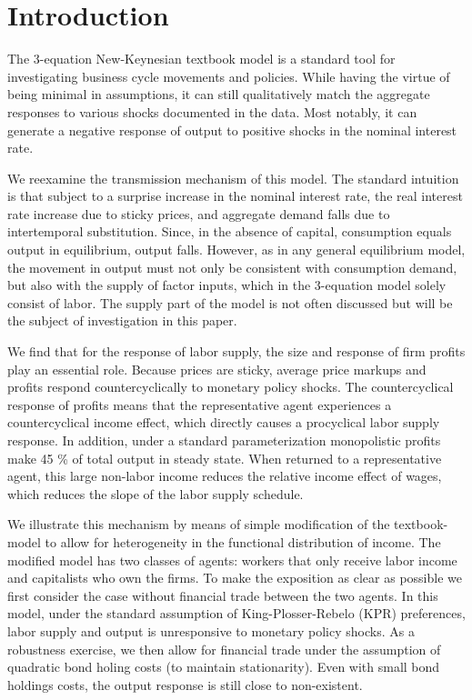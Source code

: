 \section{Introduction}
The 3-equation New-Keynesian textbook model is a standard tool for investigating business cycle movements and policies. While having the virtue of being minimal in assumptions, it can still qualitatively match the aggregate responses to various shocks documented in the data. Most notably, it can generate a negative response of output to positive shocks in the nominal interest rate. 

We reexamine the transmission mechanism of this model. The standard intuition is that subject to a surprise increase in the nominal interest rate, the real interest rate increase due to sticky prices, and aggregate demand falls due to intertemporal substitution. Since, in the absence of capital, consumption equals output in equilibrium, output falls. However, as in any general equilibrium model, the movement in output must not only be consistent with consumption demand, but also with the supply of factor inputs, which in the 3-equation model solely consist of labor. The supply part of the model is not often discussed but will be the subject of investigation in this paper.

We find that for the response of labor supply, the size and response of firm profits play an essential role. Because prices are sticky, average price markups and profits respond countercyclically to monetary policy shocks. The countercyclical response of profits means that the representative agent experiences a countercyclical income effect, which directly causes a procyclical labor supply response. In addition, under a standard parameterization monopolistic profits make 45 \% of total output in steady state. When returned to a representative agent, this large non-labor income reduces the relative income effect of wages, which reduces the slope of the labor supply schedule.    

We illustrate this mechanism by means of simple modification of the textbook-model to allow for heterogeneity in the functional distribution of income. The modified model has two classes of agents: workers that only receive labor income and capitalists who own the firms. To make the exposition as clear as possible we first consider the case without financial trade between the two agents. In this model, under the standard assumption of King-Plosser-Rebelo (KPR) preferences, labor supply and output is unresponsive to monetary policy shocks. As a robustness exercise, we then allow for financial trade under the assumption of quadratic bond holing costs (to maintain stationarity). Even with small bond holdings costs, the output response is still close to non-existent.

